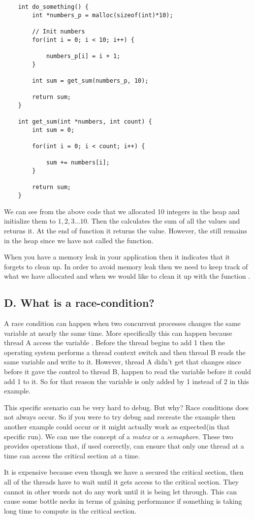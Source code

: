 \begin{lstlisting}
    int do_something() {
        int *numbers_p = malloc(sizeof(int)*10);

        // Init numbers
        for(int i = 0; i < 10; i++) {

            numbers_p[i] = i + 1;
        }

        int sum = get_sum(numbers_p, 10);
        
        return sum;
    }

    int get_sum(int *numbers, int count) {
        int sum = 0;

        for(int i = 0; i < count; i++) {

            sum += numbers[i];
        }

        return sum;
    }
\end{lstlisting}
We can see from the above code that we allocated 10 integers in the heap and initialize them 
to $1, 2, 3 ... 10$. Then the  calculates the sum of all the values and returns it.
At the end of function  it returns the  value. However, the 
still remains in the heap since we have not called the  function.

When you have a memory leak in your application then it indicates that it forgets to clean up.
In order to avoid memory leak then we need to keep track of what we have allocated and when we would like to clean it up with the function .

\subsection{D. What is a race-condition?}
A race condition can happen when two concurrent processes changes the same variable at nearly the same time. 
More specifically this can happen because thread A access the variable . Before the thread begins to add 1 then the operating system performs a thread context switch and then thread B reads the same variable and write  to it.
However, thread A didn't get that changes since before it gave the control to thread B, happen to read the variable before it could add 1 to it. So for that reason the variable is only added by 1 instead of 2 in this example.

This specific scenario can be very hard to debug. But why? Race conditions does not always occur. So if you were to try debug and recreate the example then another example could occur or it might actually work as expected(in that specific run).
We can use the concept of a \textit{mutex} or a \textit{semaphore}. These two provides operations that, if used correctly, can ensure that 
only one thread at a time can access the critical section at a time. 

It is expensive because even though we have a secured the critical section, then all of the threads have to wait until it gets access to
the critical section. They cannot in other words not do any work until it is being let through. This can cause some bottle necks in terms of 
gaining performance if something is taking long time to compute in the critical section.
